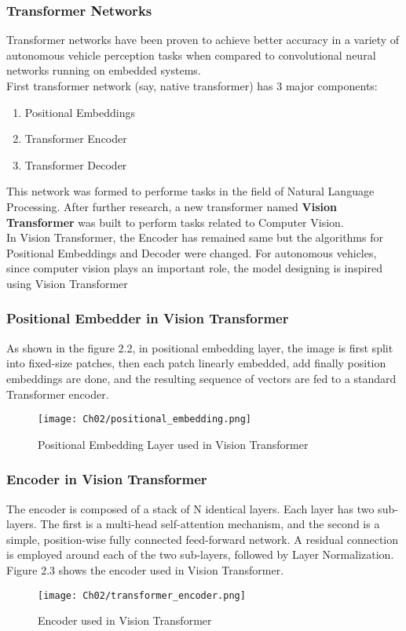 \subsubsection{Transformer Networks}
Transformer networks have been proven to achieve better accuracy in a variety of autonomous vehicle perception tasks when compared to convolutional neural networks running on embedded systems.
\\
First transformer network (say, native transformer)\cite{2017arXiv170603762V} has 3 major components:
\begin{enumerate}
    \item Positional Embeddings
    \item Transformer Encoder
    \item Transformer Decoder
\end{enumerate}
This network was formed to performe tasks in the field of Natural Language Processing. After further research, a new transformer named \textbf{Vision Transformer}\cite{dosovitskiy2021image} was built to perform tasks related to Computer Vision.
\\
In Vision Transformer, the Encoder has remained same but the algorithms for Positional Embeddings and Decoder were changed.
For autonomous vehicles, since computer vision plays an important role, the model designing is inspired using Vision Transformer

\subsubsection{Positional Embedder in Vision Transformer}
As shown in the figure 2.2, in positional embedding layer, the image is first split into fixed-size patches, then each patch linearly embedded,
add finally position embeddings are done, and the resulting sequence of vectors are fed to a standard Transformer encoder.
\begin{figure}[h]
    \centering
    \texttt{[image: Ch02/positional\_embedding.png]}
    \caption{Positional Embedding Layer used in Vision Transformer}
    \label{figure:10}
\end{figure}
\FloatBarrier

\subsubsection{Encoder in Vision Transformer}
The encoder is composed of a stack of N identical layers. Each layer has two sub-layers. The first is a multi-head self-attention mechanism, and the second is a simple, position-wise fully connected feed-forward network. A residual connection is employed around each of the two sub-layers, followed by Layer Normalization\cite{ba2016layer}.
\\
Figure 2.3 shows the encoder used in Vision Transformer.
\begin{figure}[h]
    \centering
    \texttt{[image: Ch02/transformer\_encoder.png]}
    \caption{Encoder used in Vision Transformer}
    \label{figure:11}
\end{figure}
\FloatBarrier

